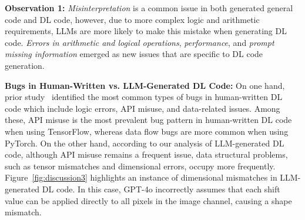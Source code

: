 

\begin{tcolorbox}[boxrule=0.5pt, colback=gray!10,  arc=4pt,left=3pt,right=3pt,top=3pt,bottom=3pt,boxsep=0pt
]
\textbf{Observation 1:} \textit{Misinterpretation} is a common issue in both generated general code and DL code, however, due to more complex logic and arithmetic requirements, LLMs are more likely to make this mistake when generating DL code. \textit{Errors in arithmetic and logical operations}, \textit{performance}, and \textit{prompt missing information} emerged as new issues that are specific to DL code generation.
\end{tcolorbox}



\newpage
\textbf{Bugs in Human-Written vs. LLM-Generated DL Code:} On one hand, prior study~\cite{islam2019comprehensive} identified the most common types of bugs in human-written DL code which include logic errors, API misuse, and data-related issues. Among these, API misuse is the most prevalent bug pattern in human-written DL code when using TensorFlow, whereas data flow bugs are more common when using PyTorch. On the other hand, according to our analysis of LLM-generated DL code, although API misuse remains a frequent issue, data structural problems, such as tensor mismatches and dimensional errors, occupy more frequently. Figure~\ref{fig:discussion3} highlights an instance of dimensional mismatches in LLM-generated DL code. In this case, GPT-4o incorrectly assumes that each shift value can be applied directly to all pixels in the image channel, causing a shape mismatch.


